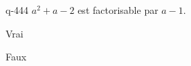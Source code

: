 \begin{truefalse}{q-444}
$a^2+a-2$ est factorisable par $a-1$.
\item* Vrai
\item Faux
\end{truefalse}

